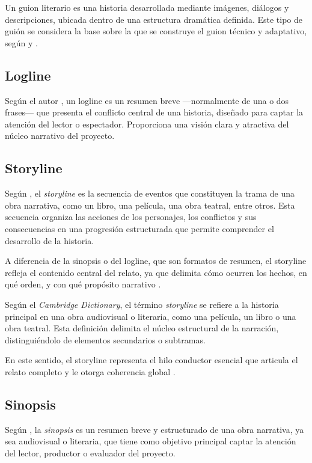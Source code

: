 \documentclass[12pt]{article}
\begin{document}
	Un guion literario es una historia desarrollada mediante imágenes, diálogos y descripciones, ubicada dentro de una estructura dramática definida. Este tipo de guión se considera la base sobre la que se construye el guion técnico y adaptativo, según \textcite{field2005} y \textcite{gulino2004}.

	\subsection{Logline}

	Según el autor \textcite{snyder2005}, un logline es un resumen breve —normalmente de una o dos frases— que presenta el conflicto central de una historia, diseñado para captar la atención del lector o espectador. Proporciona una visión clara y atractiva del núcleo narrativo del proyecto.

	\subsection{Storyline}

	Según \textcite{trottier2005}, el \textit{storyline} es la secuencia de eventos que constituyen la trama de una obra narrativa, como un libro, una película, una obra teatral, entre otros. Esta secuencia organiza las acciones de los personajes, los conflictos y sus consecuencias en una progresión estructurada que permite comprender el desarrollo de la historia.

	A diferencia de la sinopsis o del logline, que son formatos de resumen, el storyline refleja el contenido central del relato, ya que delimita cómo ocurren los hechos, en qué orden, y con qué propósito narrativo \parencite{cambridge_storyline}.

	Según el \textit{Cambridge Dictionary}, el término \textit{storyline} se refiere a la historia principal en una obra audiovisual o literaria, como una película, un libro o una obra teatral. Esta definición delimita el núcleo estructural de la narración, distinguiéndolo de elementos secundarios o subtramas.

	En este sentido, el storyline representa el hilo conductor esencial que articula el relato completo y le otorga coherencia global \parencite{cambridge_storyline}.

	\subsection{Sinopsis}

	Según \textcite{howard1995}, la \textit{sinopsis} es un resumen breve y estructurado de una obra narrativa, ya sea audiovisual o literaria, que tiene como objetivo principal captar la atención del lector, productor o evaluador del proyecto.
\end{document}
